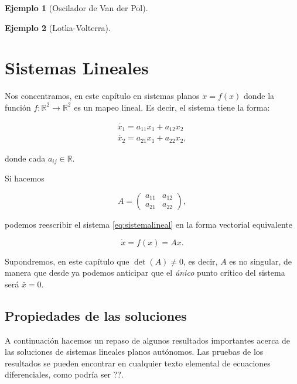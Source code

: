 \documentclass[11pt]{book}
\theoremstyle{definition}
\numberwithin{definition}{section}
\theoremstyle{theorem}
\numberwithin{theorem}{section}
\numberwithin{lemma}{section}
\numberwithin{corollary}{section}
\theoremstyle{plain}
\newtheorem{example}{Ejemplo}
\numberwithin{example}{section}
\newcommand{\R}{{\ensuremath{\mathbb{R}}}}
\begin{document}
\begin{example}[Oscilador de Van der Pol]
\end{example}

\begin{example}[Lotka-Volterra]
\end{example}


\chapter{Sistemas Lineales}

Nos concentramos, en este capítulo en sistemas planos $\dot{x} = f(x)$ donde la función $f: \R^2 \to \R^2$ es un mapeo lineal. Es decir, el sistema tiene la forma:

\begin{equation} \label{eq:sistemalineal}
	\begin{array}{l}
		\dot{x_1} = a_{11}x_1 + a_{12}x_2 \\
		\dot{x_2} = a_{21}x_1 + a_{22}x_2,
	\end{array}
\end{equation}

donde cada $a_{ij} \in \R$.

Si hacemos

$$ A = \left(
\begin{array}{ll}
	a_{11} & a_{12} \\
	a_{21} & a_{22}
\end{array}
\right),
$$

podemos reescribir el sistema \ref{eq:sistemalineal} en la forma vectorial equivalente

\begin{equation} \label{eq:sistemalinealv}
	\dot{x} = f(x) = Ax.
\end{equation}

Supondremos, en este capítulo que $\det(A) \neq 0$, es decir, $A$ es no singular, de manera que desde ya podemos anticipar que el \emph{único} punto crítico del sistema será $\bar{x} = 0$.

\section{Propiedades de las soluciones}

A continuación hacemos un repaso de algunos resultados importantes acerca de las soluciones de sistemas lineales planos autónomos. Las pruebas de los resultados se pueden encontrar en cualquier texto elemental de ecuaciones diferenciales, como podría ser ??.
\end{document}
